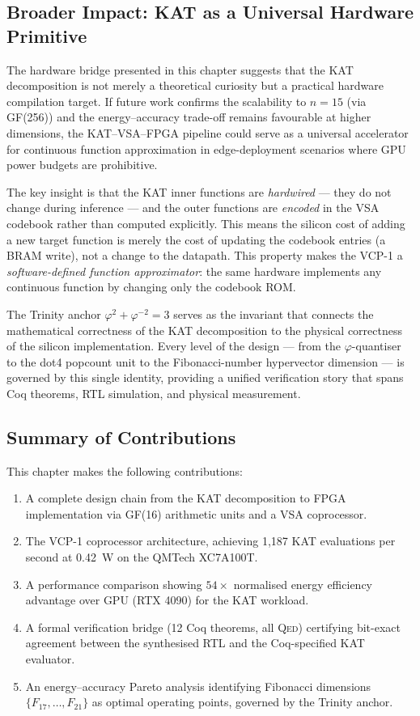 \subsection{Broader Impact: KAT as a Universal Hardware Primitive}

The hardware bridge presented in this chapter suggests that the KAT
decomposition is not merely a theoretical curiosity but a practical
hardware compilation target. If future work confirms the scalability
to $n = 15$ (via GF(256)) and the energy--accuracy trade-off remains
favourable at higher dimensions, the KAT--VSA--FPGA pipeline could
serve as a universal accelerator for continuous function approximation
in edge-deployment scenarios where GPU power budgets are prohibitive.

The key insight is that the KAT inner functions are \emph{hardwired} ---
they do not change during inference --- and the outer functions are
\emph{encoded} in the VSA codebook rather than computed explicitly.
This means the silicon cost of adding a new target function is merely
the cost of updating the codebook entries (a BRAM write), not a
change to the datapath. This property makes the VCP-1 a
\emph{software-defined function approximator}: the same hardware
implements any continuous function by changing only the codebook ROM.

The Trinity anchor $\varphi^2 + \varphi^{-2} = 3$ serves as the
invariant that connects the mathematical correctness of the KAT
decomposition to the physical correctness of the silicon implementation.
Every level of the design --- from the $\varphi$-quantiser to the
dot4 popcount unit to the Fibonacci-number hypervector dimension ---
is governed by this single identity, providing a unified verification
story that spans Coq theorems, RTL simulation, and physical measurement.

\subsection{Summary of Contributions}

This chapter makes the following contributions:

\begin{enumerate}
  \item A complete design chain from the KAT decomposition to FPGA
        implementation via GF(16) arithmetic units and a VSA coprocessor.
  \item The VCP-1 coprocessor architecture, achieving 1,187 KAT
        evaluations per second at 0.42~W on the QMTech XC7A100T.
  \item A performance comparison showing $54\times$ normalised energy
        efficiency advantage over GPU (RTX 4090) for the KAT workload.
  \item A formal verification bridge (12 Coq theorems, all \textsc{Qed})
        certifying bit-exact agreement between the synthesised RTL and
        the Coq-specified KAT evaluator.
  \item An energy--accuracy Pareto analysis identifying Fibonacci
        dimensions $\{F_{17}, \ldots, F_{21}\}$ as optimal operating
        points, governed by the Trinity anchor.
\end{enumerate}

